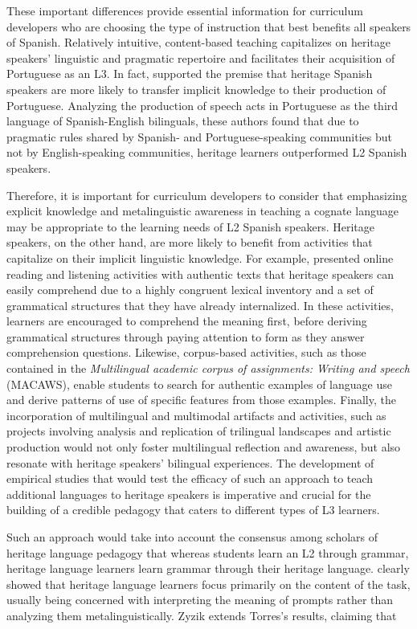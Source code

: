 \documentclass[output=paper]{../langscibook}
\begin{document}
These important differences provide essential information for curriculum developers who are choosing the type of instruction that best benefits all speakers of Spanish. Relatively intuitive, content-based teaching capitalizes on heritage speakers’ linguistic and pragmatic repertoire and facilitates their acquisition of Portuguese as an L3. In fact, \citet{KoikeFlanzer2004} supported the premise that heritage Spanish speakers are more likely to transfer implicit knowledge to their production of Portuguese. Analyzing the production of speech acts in Portuguese as the third language of Spanish-English bilinguals, these authors found that due to pragmatic rules shared by Spanish- and Portuguese-speaking communities but not by English-speaking communities, heritage learners outperformed L2 Spanish speakers.

Therefore, it is important for curriculum developers to consider that emphasizing explicit knowledge and metalinguistic awareness in teaching a cognate language may be appropriate to the learning needs of L2 Spanish speakers. Heritage speakers, on the other hand, are more likely to benefit from activities that capitalize on their implicit linguistic knowledge. For example, \citet{CarvalhoEtAl2010} presented online reading and listening activities with authentic texts that heritage speakers can easily comprehend due to a highly congruent lexical inventory and a set of grammatical structures that they have already internalized. In these activities, learners are encouraged to comprehend the meaning first, before deriving grammatical structures through paying attention to form as they answer comprehension questions. Likewise, corpus-based activities, such as those contained in the \emph{Multilingual academic corpus of assignments: Writing and speech} (MACAWS), enable students to search for authentic examples of language use and derive patterns of use of specific features from those examples. Finally, the incorporation of multilingual and multimodal artifacts and activities, such as projects involving analysis and replication of trilingual landscapes and artistic production would not only foster multilingual reflection and awareness, but also resonate with heritage speakers’ bilingual experiences. The development of empirical studies that would test the efficacy of such an approach to teach additional languages to heritage speakers is imperative and crucial for the building of a credible pedagogy that caters to different types of L3 learners.

Such an approach would take into account the consensus among scholars of heritage language pedagogy that whereas students learn an L2 through grammar, heritage language learners learn grammar through their heritage language. \citet{Torres2013} clearly showed that heritage language learners focus primarily on the content of the task, usually being concerned with interpreting the meaning of prompts rather than analyzing them metalinguistically. Zyzik extends Torres’s results, claiming that 
\end{document}
